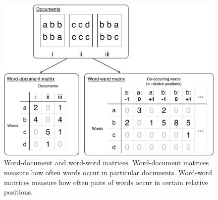 \documentclass[man,floatsintext]{apa6}
\begin{document}
\begin{figure}
  \begin{center}
    \includegraphics[width=0.9\linewidth]{matrices}
  \end{center}
  \caption{Word-document and word-word matrices. Word-document matrices measure how often words occur in particular documents. Word-word matrices measure how often pairs of words occur in certain relative positions.}
  \label{matrices}
\end{figure}
\end{document}
